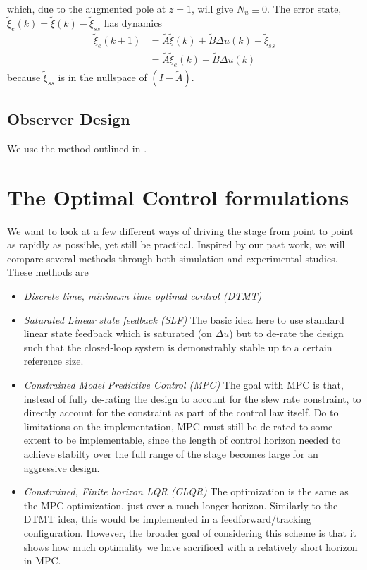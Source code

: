 \documentclass[journal,12pt,twocolumn,twoside]{IEEEtran/IEEEtran}
\newcommand{\Ad}{\ensuremath{\tilde A }\xspace}
\newcommand{\Bd}{\ensuremath{\tilde B }\xspace}
\newcommand{\xd}{\ensuremath{\tilde \xi }\xspace}
\newcommand{\xdss}{\ensuremath{\tilde \xi_{ss} }\xspace}
\newcommand{\xde}{\ensuremath{\tilde \xi_{e} }\xspace}
\newcommand{\dd}{\ensuremath{\Delta }\xspace}
\begin{document}
which, due to the augmented pole at $z=1$, will give \(N_u\equiv 0\). 
The error state, \({\xde(k)=\xd(k) - \xdss}\) has dynamics
\begin{align}
  \xde(k+1) & = \Ad\xd(k) + \Bd\dd u(k) - \xdss \nonumber\\
            & = \Ad \xde(k)   + \Bd \dd u(k)\nonumber
\end{align}
because $\xdss$ is in the nullspace of $(I - \Ad)$.

\subsection{Observer Design}

We use the method outlined in \cite{doyle_robustness_1979}.

\section{The Optimal Control formulations}
We want to look at a few different ways of driving the stage from point to point as rapidly as possible, yet still be practical. Inspired by our past work, we will compare several methods through both simulation and experimental studies. These methods are
\begin{itemize}
\item\emph{Discrete time, minimum time optimal control (DTMT)}
\item\emph{Saturated Linear state feedback (SLF)} The basic idea here to use standard linear state feedback which is saturated (on $\Delta u$) but to de-rate the design such that the closed-loop system is demonstrably stable up to a certain reference size. 
\item\emph{Constrained Model Predictive Control (MPC)} The goal with MPC is that, instead of fully de-rating the design to account for the slew rate constraint, to directly account for the constraint as part of the control law itself. Do to limitations on the implementation, MPC must still be de-rated to some extent to be implementable, since the length of control horizon needed to achieve stabilty over the full range of the stage becomes large for an aggressive design.
\item\emph{Constrained, Finite horizon LQR (CLQR)} The optimization is the same as the MPC optimization, just over a much longer horizon. Similarly to the DTMT idea, this would be implemented in a feedforward/tracking configuration. However, the broader goal of considering this scheme is that it shows how much optimality we have sacrificed with a relatively short horizon in MPC.
\end{itemize}
\end{document}
